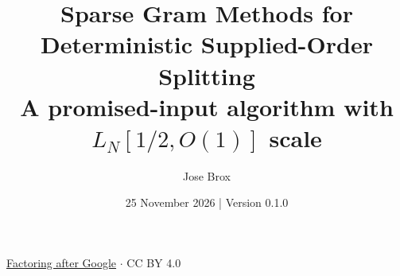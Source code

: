 
\title{Sparse Gram Methods for Deterministic Supplied-Order Splitting\\[0.4em]\large A promised-input algorithm with $L_N[1/2,O(1)]$ scale}
\renewcommand{\paperrunningtitle}{Deterministic supplied-order splitting}
\author{Jose Brox}
\date{25 November 2026 \quad | \quad Version 0.1.0}

\maketitle
\begin{center}\small\href{https://github.com/JoseBrox/Factoring_after_Google}{Factoring after Google} $\cdot$ CC BY 4.0\end{center}

\clearpage



